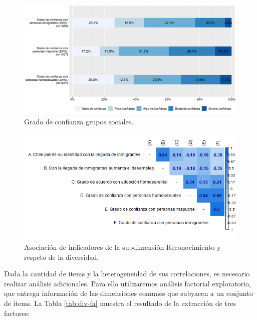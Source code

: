 \documentclass[
  12pt,
]{book}
\begin{document}
\begin{figure}[H]

{\centering \includegraphics[width=1\linewidth,height=1\textheight]{output/graphs/diversidad} 

}

\caption{Grado de confianza grupos sociales.}\label{fig:diversidad}
\end{figure}

\begin{figure}[H]

{\centering \includegraphics[width=1\linewidth,height=1\textheight]{output/graphs/diversidad_cor} 

}

\caption{Asociación de indicadores de la subdimensión Reconocimiento y respeto de la diversidad.}\label{fig:diversidad-cor}
\end{figure}

Dada la cantidad de items y la heterogeneidad de sus correlaciones, es necesario realizar análisis adicionales. Para ello utilizaremos análisis factorial exploratorio, que entrega información de las dimensiones comunes que subyacen a un conjunto de items. La Tabla \ref{tab:div-fa} muestra el resultado de la extracción de tres factores:
\end{document}
